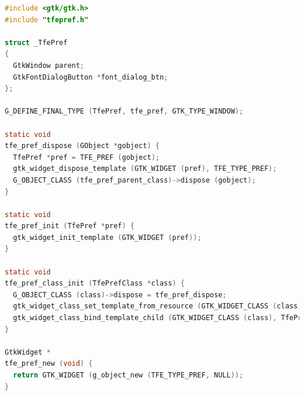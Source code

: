 \begin{lstlisting}[language=C]
#include <gtk/gtk.h>
#include "tfepref.h"

struct _TfePref
{
  GtkWindow parent;
  GtkFontDialogButton *font_dialog_btn;
};

G_DEFINE_FINAL_TYPE (TfePref, tfe_pref, GTK_TYPE_WINDOW);

static void
tfe_pref_dispose (GObject *gobject) {
  TfePref *pref = TFE_PREF (gobject);
  gtk_widget_dispose_template (GTK_WIDGET (pref), TFE_TYPE_PREF);
  G_OBJECT_CLASS (tfe_pref_parent_class)->dispose (gobject);
}

static void
tfe_pref_init (TfePref *pref) {
  gtk_widget_init_template (GTK_WIDGET (pref));
}

static void
tfe_pref_class_init (TfePrefClass *class) {
  G_OBJECT_CLASS (class)->dispose = tfe_pref_dispose;
  gtk_widget_class_set_template_from_resource (GTK_WIDGET_CLASS (class), "/com/github/ToshioCP/tfe/tfepref.ui");
  gtk_widget_class_bind_template_child (GTK_WIDGET_CLASS (class), TfePref, font_dialog_btn);
}

GtkWidget *
tfe_pref_new (void) {
  return GTK_WIDGET (g_object_new (TFE_TYPE_PREF, NULL));
}
\end{lstlisting}

